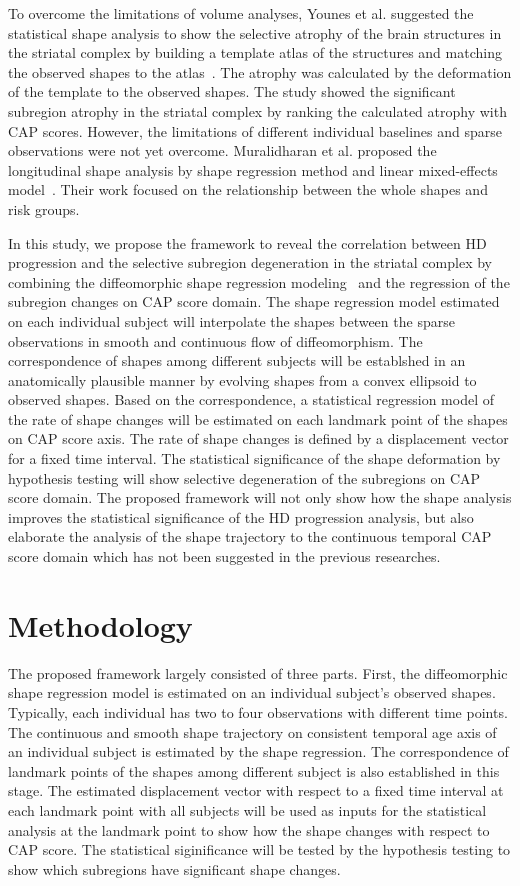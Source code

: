 \documentclass[10pt]{article}
\begin{document}
To overcome the limitations of volume analyses, Younes et al. suggested the statistical shape analysis to show the selective atrophy of the brain structures in the striatal complex 
by building a template atlas of the structures and matching the observed shapes to the atlas~\cite{Younes2014}. 
The atrophy was calculated by the deformation of the template to the observed shapes. The study showed the significant subregion atrophy in the striatal complex by ranking the calculated atrophy with CAP scores.
However, the limitations of different individual baselines and sparse observations were not yet overcome. 
Muralidharan et al. proposed the longitudinal shape analysis by shape regression method and linear mixed-effects model~\cite{Prasa2014}.
Their work focused on the relationship between the whole shapes and risk groups. 

In this study, we propose the framework to reveal the correlation between HD progression and the selective subregion degeneration 
in the striatal complex by combining the diffeomorphic shape regression modeling~\cite{Fishbaugh2013} and the regression of the subregion changes on CAP score domain. 
The shape regression model estimated on each individual subject will interpolate the shapes between the sparse observations in smooth and continuous flow of diffeomorphism.
The correspondence of shapes among different subjects will be establshed in an anatomically plausible manner by evolving shapes from a convex ellipsoid to observed shapes.
Based on the correspondence, a statistical regression model of the rate of shape changes will be estimated on each landmark point of the shapes on CAP score axis.
The rate of shape changes is defined by a displacement vector for a fixed time interval. 
The statistical significance of the shape deformation by hypothesis testing will show selective degeneration of the subregions on CAP score domain. 
The proposed framework will not only show how the shape analysis improves the statistical significance of the HD progression analysis, 
but also elaborate the analysis of the shape trajectory to the continuous temporal CAP score domain which has not been suggested in the previous researches. 

\section*{Methodology}

The proposed framework largely consisted of three parts. First, the diffeomorphic shape regression model is estimated on an individual subject's observed shapes. 
Typically, each individual has two to four observations with different time points. The continuous and smooth shape trajectory on consistent temporal age axis of an individual subject is estimated by the shape regression.
The correspondence of landmark points of the shapes among different subject is also established in this stage. 
The estimated displacement vector with respect to a fixed time interval at each landmark point with all subjects will 
be used as inputs for the statistical analysis at the landmark point to show how the shape changes with respect to CAP score. 
The statistical siginificance will be tested by the hypothesis testing to show which subregions have significant shape changes. 
\end{document}

